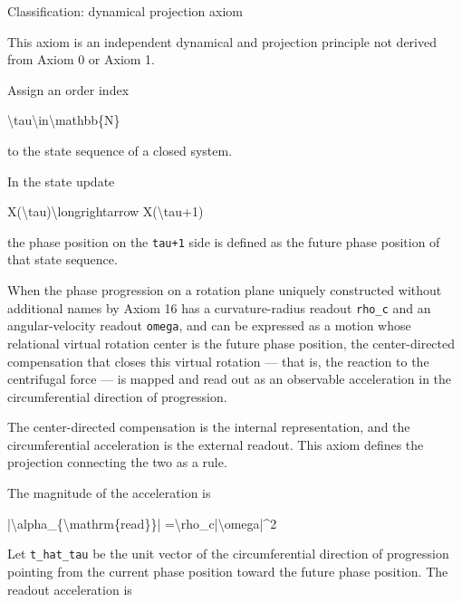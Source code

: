 \documentclass[
  a4paper,
]{article}
\newenvironment{Shaded}{}{}
\newcommand{\NormalTok}[1]{#1}
\begin{document}
Classification: dynamical projection axiom

This axiom is an independent dynamical and projection principle not
derived from Axiom 0 or Axiom 1.

Assign an order index

\begin{Shaded}
\begin{Highlighting}[]
\NormalTok{\textbackslash{}tau\textbackslash{}in\textbackslash{}mathbb\{N\}}
\end{Highlighting}
\end{Shaded}

to the state sequence of a closed system.

In the state update

\begin{Shaded}
\begin{Highlighting}[]
\NormalTok{X(\textbackslash{}tau)\textbackslash{}longrightarrow X(\textbackslash{}tau+1)}
\end{Highlighting}
\end{Shaded}

the phase position on the \texttt{tau+1} side is defined as the future
phase position of that state sequence.

When the phase progression on a rotation plane uniquely constructed
without additional names by Axiom 16 has a curvature-radius readout
\texttt{rho\_c} and an angular-velocity readout \texttt{omega}, and can
be expressed as a motion whose relational virtual rotation center is the
future phase position, the center-directed compensation that closes this
virtual rotation --- that is, the reaction to the centrifugal force ---
is mapped and read out as an observable acceleration in the
circumferential direction of progression.

The center-directed compensation is the internal representation, and the
circumferential acceleration is the external readout. This axiom defines
the projection connecting the two as a rule.

The magnitude of the acceleration is

\begin{Shaded}
\begin{Highlighting}[]
\NormalTok{|\textbackslash{}alpha\_\{\textbackslash{}mathrm\{read\}\}|}
\NormalTok{=\textbackslash{}rho\_c|\textbackslash{}omega|\^{}2}
\end{Highlighting}
\end{Shaded}

Let \texttt{t\_hat\_tau} be the unit vector of the circumferential
direction of progression pointing from the current phase position toward
the future phase position. The readout acceleration is
\end{document}
